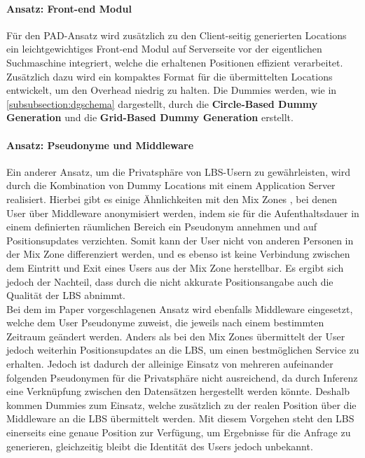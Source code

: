 \paragraph{Ansatz: Front-end Modul \cite{Lu2008}} \label{para:modul}
Für den PAD-Ansatz wird zusätzlich zu den Client-seitig generierten Locations ein leichtgewichtiges Front-end Modul auf Serverseite vor der eigentlichen Suchmaschine integriert, welche die erhaltenen Positionen effizient verarbeitet. Zusätzlich dazu wird ein kompaktes Format für die übermittelten Locations entwickelt, um den Overhead niedrig zu halten. Die Dummies werden, wie in \ref{subsubsection:dgschema} dargestellt, durch die \textbf{Circle-Based Dummy Generation} und die \textbf{Grid-Based Dummy Generation} erstellt.

\paragraph{Ansatz: Pseudonyme und Middleware \cite{Sahu2012}} \label{para:middle}
Ein anderer Ansatz, um die Privatsphäre von LBS-Usern zu gewährleisten, wird durch die Kombination von Dummy Locations mit einem Application Server realisiert. Hierbei gibt es einige Ähnlichkeiten mit den Mix Zones \cite{Beresford2003}, bei denen User über Middleware anonymisiert werden, indem sie für die Aufenthaltsdauer in einem definierten räumlichen Bereich ein Pseudonym annehmen und auf Positionsupdates verzichten. Somit kann der User nicht von anderen Personen in der Mix Zone differenziert werden, und es ebenso ist keine Verbindung zwischen dem Eintritt und Exit eines Users aus der Mix Zone herstellbar. Es ergibt sich jedoch der Nachteil, dass durch die nicht akkurate Positionsangabe auch die Qualität der LBS abnimmt.\\
Bei dem im Paper vorgeschlagenen Ansatz wird ebenfalls Middleware eingesetzt, welche dem User Pseudonyme zuweist, die jeweils nach einem bestimmten Zeitraum geändert werden. Anders als bei den Mix Zones übermittelt der User jedoch weiterhin Positionsupdates an die LBS, um einen bestmöglichen Service zu erhalten. Jedoch ist dadurch der alleinige Einsatz von mehreren aufeinander folgenden Pseudonymen für die Privatsphäre nicht ausreichend, da durch Inferenz eine Verknüpfung zwischen den Datensätzen hergestellt werden könnte. Deshalb kommen Dummies zum Einsatz, welche zusätzlich zu der realen Position über die Middleware an die LBS übermittelt werden. Mit diesem Vorgehen steht den LBS einerseits eine genaue Position zur Verfügung, um Ergebnisse für die Anfrage zu generieren, gleichzeitig bleibt die Identität des Users jedoch unbekannt.

